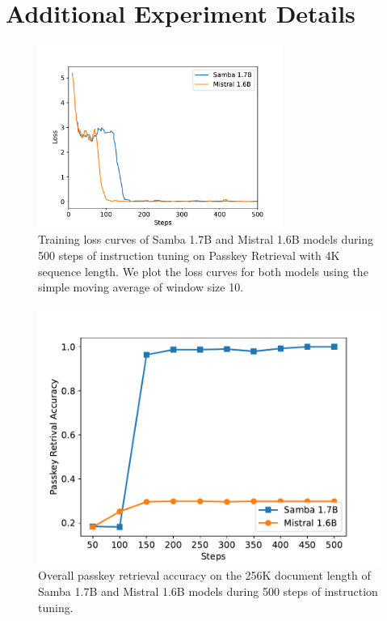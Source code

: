 \documentclass{article}
\begin{document}
\section{Additional Experiment Details} \label{pk}
\begin{figure}[!ht]
    \centering
    \includegraphics[width=8cm]{passkey_train_curve.pdf}
    \caption{Training loss curves of Samba 1.7B and Mistral 1.6B models during 500 steps of instruction tuning on Passkey Retrieval with 4K sequence length.  We plot the loss curves for both models using the simple moving average of window size 10. }
    \label{fig:loss_pk}
\end{figure}

\begin{figure}[!ht]
    \centering
    \includegraphics[width=0.5\linewidth]{passkey_retrival_acc.pdf}
    \caption{Overall passkey retrieval accuracy on the 256K document length of Samba 1.7B and Mistral 1.6B models during 500 steps of instruction tuning.}
    \label{fig:acc_pk}
\end{figure}
\end{document}

